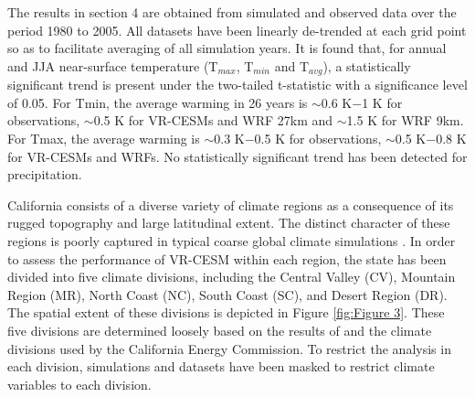 \documentclass[draft,ms]{agutex}   %
\begin{document}
\begin{article}
The results in section 4 are obtained from simulated and observed data over the period 1980 to 2005.  All datasets have been linearly de-trended at each grid point so as to facilitate averaging of all simulation years. It is found that, for annual and JJA near-surface temperature (T$_{max}$, T$_{min}$ and T$_{avg}$), a statistically significant trend is present under the two-tailed t-statistic with a significance level of 0.05. For Tmin, the average warming in 26 years is $\sim$0.6 K$-$1 K for observations, $\sim$0.5 K for VR-CESMs and WRF 27km and $\sim$1.5 K for WRF 9km. For Tmax, the average warming is $\sim$0.3 K$-$0.5 K for observations, $\sim$0.5 K$-$0.8 K for VR-CESMs and WRFs. No statistically significant trend has been detected for precipitation.

California consists of a diverse variety of climate regions as a consequence of its rugged topography and large latitudinal extent.  The distinct character of these regions is poorly captured in typical coarse global climate simulations \citep{abatzoglou2009classification, caldwell2009evaluation}.  In order to assess the performance of VR-CESM within each region, the state has been divided into five climate divisions, including the Central Valley (CV), Mountain Region (MR), North Coast (NC), South Coast (SC), and Desert Region (DR).  The spatial extent of these divisions is depicted in Figure \ref{fig:Figure 3}. These five divisions are determined loosely based on the results of \cite{abatzoglou2009classification} and the climate divisions used by the California Energy Commission. To restrict the analysis in each division, simulations and datasets have been masked to restrict climate variables to each division. 



\end{article}
\end{document}
